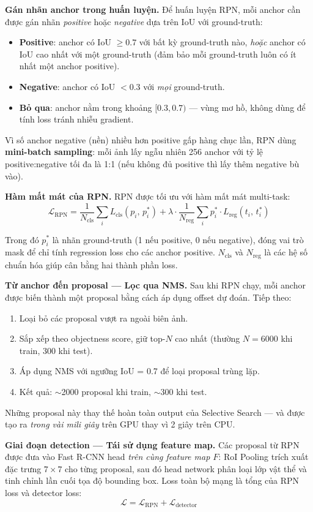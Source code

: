 \textbf{Gán nhãn anchor trong huấn luyện.}
Để huấn luyện RPN, mỗi anchor cần được gán nhãn \textit{positive} hoặc \textit{negative} dựa trên IoU với ground-truth:
\begin{itemize}
	\item \textbf{Positive}: anchor có IoU $\geq 0.7$ với bất kỳ ground-truth nào, \textit{hoặc} anchor có IoU cao nhất với một ground-truth (đảm bảo mỗi ground-truth luôn có ít nhất một anchor positive).
	\item \textbf{Negative}: anchor có IoU $< 0.3$ với \textit{mọi} ground-truth.
	\item \textbf{Bỏ qua}: anchor nằm trong khoảng $[0.3, 0.7)$ --- vùng mơ hồ, không dùng để tính loss tránh nhiễu gradient.
\end{itemize}

Vì số anchor negative (nền) nhiều hơn positive gấp hàng chục lần, RPN dùng \textbf{mini-batch sampling}: mỗi ảnh lấy ngẫu nhiên 256 anchor với tỷ lệ positive:negative tối đa là 1:1 (nếu không đủ positive thì lấy thêm negative bù vào).

\textbf{Hàm mất mát của RPN.}
RPN được tối ưu với hàm mất mát multi-task:
\[
\mathcal{L}_{\text{RPN}} = \frac{1}{N_{\text{cls}}} \sum_i L_{\text{cls}}(p_i,\, p_i^*) + \lambda \cdot \frac{1}{N_{\text{reg}}} \sum_i p_i^* \cdot L_{\text{reg}}(t_i,\, t_i^*)
\]

Trong đó $p_i^*$ là nhãn ground-truth (1 nếu positive, 0 nếu negative), đóng vai trò mask để chỉ tính regression loss cho các anchor positive. $N_{\text{cls}}$ và $N_{\text{reg}}$ là các hệ số chuẩn hóa giúp cân bằng hai thành phần loss.

\textbf{Từ anchor đến proposal — Lọc qua NMS.}
Sau khi RPN chạy, mỗi anchor được biến thành một proposal bằng cách áp dụng offset dự đoán. Tiếp theo:
\begin{enumerate}
	\item Loại bỏ các proposal vượt ra ngoài biên ảnh.
	\item Sắp xếp theo objectness score, giữ top-$N$ cao nhất (thường $N = 6000$ khi train, 300 khi test).
	\item Áp dụng NMS với ngưỡng IoU = 0.7 để loại proposal trùng lặp.
	\item Kết quả: $\sim$2000 proposal khi train, $\sim$300 khi test.
\end{enumerate}
Những proposal này thay thế hoàn toàn output của Selective Search --- và được tạo ra \textit{trong vài mili giây} trên GPU thay vì 2 giây trên CPU.

\textbf{Giai đoạn detection — Tái sử dụng feature map.}
Các proposal từ RPN được đưa vào Fast R-CNN head \textit{trên cùng feature map $F$}: RoI Pooling trích xuất đặc trưng $7 \times 7$ cho từng proposal, sau đó head network phân loại lớp vật thể và tinh chỉnh lần cuối tọa độ bounding box. Loss toàn bộ mạng là tổng của RPN loss và detector loss:
\[
\mathcal{L} = \mathcal{L}_{\text{RPN}} + \mathcal{L}_{\text{detector}}
\]

